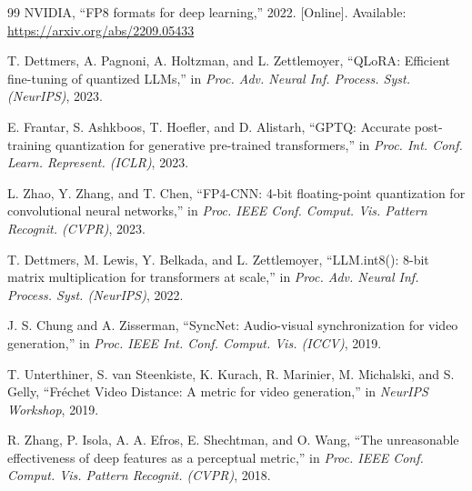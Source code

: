 \documentclass[journal,twoside]{IEEEtran}
\theoremstyle{definition}
\theoremstyle{remark}
\begin{document}
\begin{thebibliography}{99}
NVIDIA, ``{FP8} formats for deep learning,'' 2022. [Online]. Available: \url{https://arxiv.org/abs/2209.05433}

T. Dettmers, A. Pagnoni, A. Holtzman, and L. Zettlemoyer, ``{QLoRA}: Efficient fine-tuning of quantized {LLM}s,'' in \textit{Proc. Adv. Neural Inf. Process. Syst. (NeurIPS)}, 2023.

E. Frantar, S. Ashkboos, T. Hoefler, and D. Alistarh, ``{GPTQ}: Accurate post-training quantization for generative pre-trained transformers,'' in \textit{Proc. Int. Conf. Learn. Represent. (ICLR)}, 2023.

L. Zhao, Y. Zhang, and T. Chen, ``{FP4-CNN}: 4-bit floating-point quantization for convolutional neural networks,'' in \textit{Proc. IEEE Conf. Comput. Vis. Pattern Recognit. (CVPR)}, 2023.

T. Dettmers, M. Lewis, Y. Belkada, and L. Zettlemoyer, ``{LLM.int8()}: 8-bit matrix multiplication for transformers at scale,'' in \textit{Proc. Adv. Neural Inf. Process. Syst. (NeurIPS)}, 2022.

J. S. Chung and A. Zisserman, ``{SyncNet}: Audio-visual synchronization for video generation,'' in \textit{Proc. IEEE Int. Conf. Comput. Vis. (ICCV)}, 2019.

T. Unterthiner, S. van Steenkiste, K. Kurach, R. Marinier, M. Michalski, and S. Gelly, ``Fréchet Video Distance: A metric for video generation,'' in \textit{NeurIPS Workshop}, 2019.

R. Zhang, P. Isola, A. A. Efros, E. Shechtman, and O. Wang, ``The unreasonable effectiveness of deep features as a perceptual metric,'' in \textit{Proc. IEEE Conf. Comput. Vis. Pattern Recognit. (CVPR)}, 2018.

\end{thebibliography}
\end{document}
